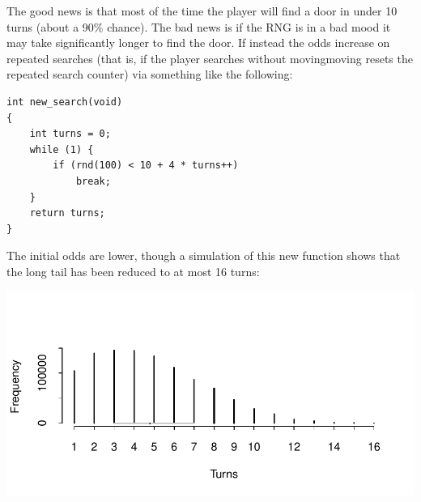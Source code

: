 \documentclass[12pt,a4paper]{article}
\begin{document}
The good news is that most of the time the player will find a door in
under 10 turns (about a 90\% chance). The bad news is if the RNG is in a
bad mood it may take significantly longer to find the door. If instead
the odds increase on repeated searches (that is, if the player searches
without moving\textendash moving resets the repeated search counter) via
something like the following:

\begin{verbatim}
int new_search(void)
{
    int turns = 0;
    while (1) {
        if (rnd(100) < 10 + 4 * turns++)
            break;
    }
    return turns;
}
\end{verbatim}

The initial odds are lower, though a simulation of this new
function shows that the long tail has been reduced to at most
16 turns:

\includegraphics{new-door-find-frequency.pdf}%
\end{document}

